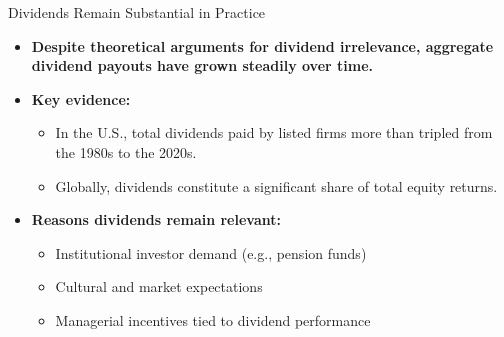 \begin{frame}{Dividends Remain Substantial in Practice}
\footnotesize
\begin{itemize}
    \item \textbf{Despite theoretical arguments for dividend irrelevance, aggregate dividend payouts have grown steadily over time.}
    
    \vspace{2mm}
    \item \textbf{Key evidence:}
    \begin{itemize}
        \item In the U.S., total dividends paid by listed firms more than tripled from the 1980s to the 2020s.
        \item Globally, dividends constitute a significant share of total equity returns.
    \end{itemize}
    
    \vspace{2mm}
    \item \textbf{Reasons dividends remain relevant:}
    \begin{itemize}
        \item Institutional investor demand (e.g., pension funds)
        \item Cultural and market expectations
        \item Managerial incentives tied to dividend performance
    \end{itemize}
\end{itemize}
\end{frame}

